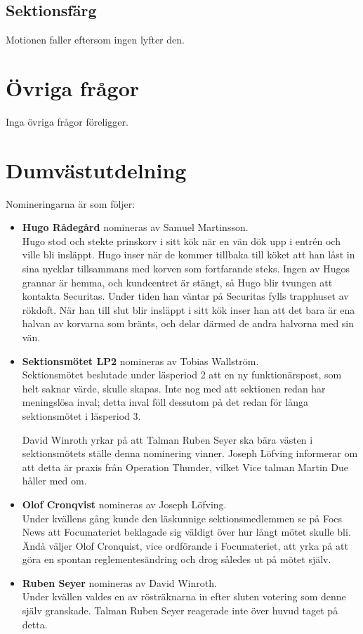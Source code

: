 \documentclass[hidelinks]{sektionsmote}
\begin{document}
\subsection{Sektionsfärg}
Motionen faller eftersom ingen lyfter den.

\section{Övriga frågor}
Inga övriga frågor föreligger.

\section{Dumvästutdelning}
Nomineringarna är som följer:
\begin{itemize}
  \item \textbf{Hugo Rådegård} nomineras av Samuel Martinsson.\\
  Hugo stod och stekte prinskorv i sitt kök när en vän dök upp i entrén och ville bli insläppt.
  Hugo inser när de kommer tillbaka till köket att han låst in sina nycklar tillsammans med korven som fortfarande steks.
  Ingen av Hugos grannar är hemma, och kundcentret är stängt, så Hugo blir tvungen att kontakta Securitas.
  Under tiden han väntar på Securitas fylls trapphuset av rökdoft.
  När han till slut blir insläppt i sitt kök inser han att det bara är ena halvan av korvarna som bränts, och delar därmed de andra halvorna med sin vän.
  
  \item \textbf{Sektionsmötet LP2} nomineras av Tobias Wallström.\\
  Sektionsmötet beslutade under läsperiod 2 att en ny funktionärspost, som helt saknar värde, skulle skapas.
  Inte nog med att sektionen redan har meningslösa inval; detta inval föll dessutom på det redan för långa sektionsmötet i läsperiod 3.

  \begin{ofraga}
    David Winroth yrkar på att Talman Ruben Seyer ska bära västen i sektionsmötets ställe denna nominering vinner.
    Joseph Löfving informerar om att detta är praxis från Operation Thunder, vilket Vice talman Martin Due håller med om.
  \end{ofraga}
  
  \item \textbf{Olof Cronqvist} nomineras av Joseph Löfving.\\
  Under kvällens gång kunde den läskunnige sektionsmedlemmen se på Focs News att Focumateriet beklagade sig väldigt över hur långt mötet skulle bli. Ändå väljer Olof Cronquist, vice ordförande i Focumateriet, att yrka på att göra en spontan reglementesändring och drog således ut på mötet själv.
  
  \item \textbf{Ruben Seyer} nomineras av David Winroth.\\
  Under kvällen valdes en av rösträknarna in efter sluten votering som denne själv granskade.
  Talman Ruben Seyer reagerade inte över huvud taget på detta.

\end{itemize}
\end{document}

